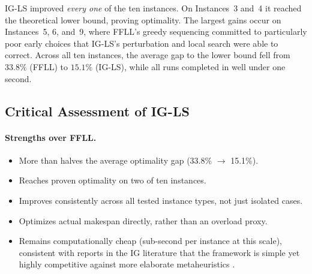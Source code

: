 \documentclass[11pt,a4paper]{article}
\begin{document}
IG-LS improved \emph{every one} of the ten instances. On Instances~3
and~4 it reached the theoretical lower bound, proving optimality. The
largest gains occur on Instances~5, 6, and~9, where FFLL's greedy
sequencing committed to particularly poor early choices that IG-LS's
perturbation and local search were able to correct. Across all ten
instances, the average gap to the lower bound fell from $33.8\%$ (FFLL) to
$15.1\%$ (IG-LS), while all runs completed in well under one second.

\subsection{Critical Assessment of IG-LS}

\paragraph{Strengths over FFLL.}
\begin{itemize}
  \item More than halves the average optimality gap (33.8\% $\to$ 15.1\%).
  \item Reaches proven optimality on two of ten instances.
  \item Improves consistently across all tested instance types, not just
    isolated cases.
  \item Optimizes actual makespan directly, rather than an overload proxy.
  \item Remains computationally cheap (sub-second per instance at this
    scale), consistent with reports in the IG literature that the
    framework is simple yet highly competitive against more elaborate
    metaheuristics \citep{ruiz2007simple}.
\end{itemize}
\end{document}
